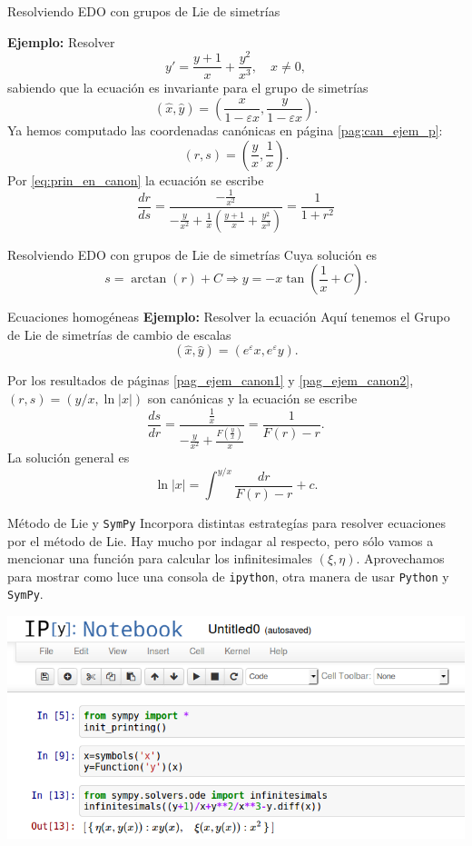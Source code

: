 \documentclass[handout,hyperref={colorlinks=true}]{beamer}
\renewcommand{\epsilon}{\varepsilon}
\begin{document}
\begin{frame}{Resolviendo EDO con grupos de Lie de simetrías}



\onslide<+->\textbf{Ejemplo:} Resolver 
\[y'=\frac{y+1}{x}+\frac{y^2}{x^3},\quad x\neq 0,\]
sabiendo que la ecuación es invariante para el grupo de simetrías
\[(\hat{x},\hat{y})=(\frac{x}{1-\epsilon x},\frac{y}{1-\epsilon x}   ).\]
Ya hemos computado las coordenadas canónicas en página \ref{pag:can_ejem_p}:
\[(r,s)=\left(\frac{y}{x},\frac{1}{x}\right).\]
Por \eqref{eq:prin_en_canon} la ecuación se escribe
\[\frac{dr}{ds}=\frac{-\frac{1}{x^2} }{-\frac{y}{x^2}+\frac{1}{x}\left(
\frac{y+1}{x}+\frac{y^2}{x^3}\right)}=\frac{1}{1+r^2}\]

\end{frame}



\begin{frame}{Resolviendo EDO con grupos de Lie de simetrías}
Cuya solución es 
\[s=\arctan(r)+C\Rightarrow y=-x\tan\left(\frac{1}{x}+C\right).\]
\end{frame}


\begin{frame}{Ecuaciones homogéneas}
\textbf{Ejemplo:} Resolver la ecuación 
Aquí tenemos el Grupo de Lie de simetrías de cambio de escalas
\[(\hat{x},\hat{y})=(e^{\epsilon}x,e^{\epsilon}y).\] 

Por los resultados de páginas \ref{pag_ejem_canon1} y \ref{pag_ejem_canon2}, $(r,s)=(y/x,\ln|x|)$ son canónicas y la ecuación se escribe
\[\frac{ds}{dr}=\frac{\frac{1}{x}}{-\frac{y}{x^2}+\frac{F\left(\frac{y}{x}\right)}{x}}=\frac{1}{F(r)-r}.\]
La solución general es 
\[\ln|x|=\int^{y/x}\frac{dr}{F(r)-r}+c.\]

\end{frame}


\begin{frame}{Método de Lie y \texttt{SymPy}}
 Incorpora distintas estrategías para resolver ecuaciones por el método de Lie. Hay mucho por indagar al respecto, pero sólo vamos a mencionar una función para calcular los infinitesimales $(\xi,\eta)$.  Aprovechamos para mostrar como luce una consola de \texttt{ipython}, otra manera de usar \texttt{Python} y \texttt{SymPy}.

\includegraphics[scale=.45]{imagenes/ipython.png}



\end{frame}
\end{document}
